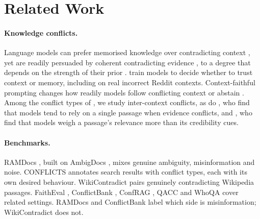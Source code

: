 \section{Related Work}
\label{sec:related}

\paragraph{Knowledge conflicts.}
Language models can prefer memorised knowledge over contradicting context \citep{longpre2021entity}, yet are readily
persuaded by coherent contradicting evidence \citep{xie2024chameleon}, to a degree that depends on the strength of
their prior \citep{wu2024clasheval}. \citet{huang2025trust} train models to decide whether to trust context or memory,
including on real incorrect Reddit contexts. Context-faithful prompting changes how readily models follow
conflicting context or abstain \citep{zhou2023context}. Among the conflict types of \citet{xu2024survey}, we study inter-context
conflicts, as do \citet{chen2022rich}, who find that models tend to rely on a single passage when evidence conflicts,
and \citet{wan2024convincing}, who find that models weigh a passage's relevance more than its credibility cues.

\paragraph{Benchmarks.}
RAMDocs \citep{wang2025madam}, built on AmbigDocs \citep{lee2024ambigdocs}, mixes genuine ambiguity, misinformation
and noise. CONFLICTS \citep{cattan2025conflicts} annotates search results with conflict types, each with its own
desired behaviour. WikiContradict \citep{hou2024wikicontradict} pairs genuinely contradicting Wikipedia passages.
FaithEval \citep{ming2025faitheval}, ConflictBank \citep{su2024conflictbank}, ConfRAG \citep{yuan2026confrag},
QACC \citep{liu2025qacc} and WhoQA \citep{pham2024whoqa} cover related settings. RAMDocs and ConflictBank label which side is misinformation; WikiContradict does not.

